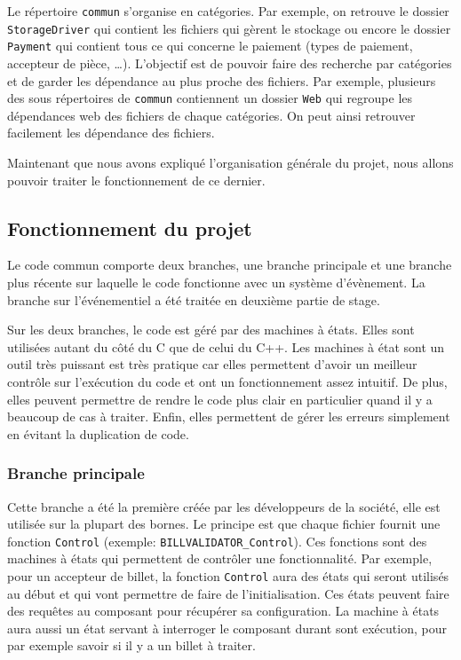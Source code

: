 \documentclass[a4paper]{article}
\begin{document}
Le répertoire \verb|commun| s'organise en catégories. Par exemple, on retrouve
le dossier \verb|StorageDriver| qui contient les fichiers qui gèrent le stockage
ou encore le dossier \verb|Payment| qui contient tous ce qui concerne le
paiement (types de paiement, accepteur de pièce, \dots). L'objectif est de
pouvoir faire des recherche par catégories et de garder les dépendance au plus
proche des fichiers. Par exemple, plusieurs des sous répertoires de
\verb|commun| contiennent un dossier \verb|Web| qui regroupe les dépendances web
des fichiers de chaque catégories. On peut ainsi retrouver facilement les
dépendance des fichiers.

Maintenant que nous avons expliqué l'organisation générale du projet, nous
allons pouvoir traiter le fonctionnement de ce dernier.

\subsection*{Fonctionnement du projet}

Le code commun comporte deux branches, une branche principale et une branche
plus récente sur laquelle le code fonctionne avec un système d'évènement. La
branche sur l'événementiel a été traitée en deuxième partie de stage.

Sur les deux branches, le code est géré par des machines à états. Elles sont
utilisées autant du côté du C que de celui du C++. Les machines à état sont un
outil très puissant est très pratique car elles permettent d'avoir un meilleur
contrôle sur l'exécution du code et ont un fonctionnement assez intuitif. De
plus, elles peuvent permettre de rendre le code plus clair en particulier quand
il y a beaucoup de cas à traiter. Enfin, elles permettent de gérer les erreurs
simplement en évitant la duplication de code.

\subsubsection*{Branche principale}

Cette branche a été la première créée par les développeurs de la société, elle
est utilisée sur la plupart des bornes. Le principe est que chaque fichier
fournit une fonction \verb|Control| (exemple: \verb|BILLVALIDATOR_Control|). Ces
fonctions sont des machines à états qui permettent de contrôler une
fonctionnalité. Par exemple, pour un accepteur de billet, la fonction
\verb|Control| aura des états qui seront utilisés au début et qui vont permettre
de faire de l'initialisation. Ces états peuvent faire des requêtes au composant
pour récupérer sa configuration. La machine à états aura aussi un état servant à
interroger le composant durant sont exécution, pour par exemple savoir si il y a
un billet à traiter.
\end{document}
